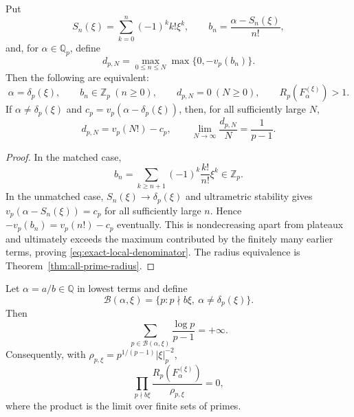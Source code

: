 \begin{proposition}
\label{prop:local-denominator-radius}
Put
\[
 S_n(\xi)=\sum_{k=0}^n(-1)^kk!\xi^k,
 \qquad b_n=\frac{\alpha-S_n(\xi)}{n!},
\]
and, for $\alpha\in\mathbb Q_p$, define
\[
 d_{p,N}=\max_{0\leq n\leq N}\max\{0,-v_p(b_n)\}.
\]
Then the following are equivalent:
\begin{equation}
 \alpha=\delta_p(\xi),\qquad
 b_n\in\mathbb Z_p\ (n\geq0),\qquad
 d_{p,N}=0\ (N\geq0),\qquad
 R_p(F_\alpha^{(\xi)})>1.
\label{eq:four-local-equivalences}
\end{equation}
If $\alpha\ne\delta_p(\xi)$ and
$c_p=v_p(\alpha-\delta_p(\xi))$, then, for all sufficiently large $N$,
\begin{equation}
 d_{p,N}=v_p(N!)-c_p,
 \qquad
 \lim_{N\to\infty}\frac{d_{p,N}}N=\frac1{p-1}.
\label{eq:exact-local-denominator}
\end{equation}
\end{proposition}

\begin{proof}
In the matched case,
\[
 b_n=\sum_{k\geq n+1}(-1)^k\frac{k!}{n!}\xi^k\in\mathbb Z_p.
\]
In the unmatched case, $S_n(\xi)\to\delta_p(\xi)$ and ultrametric
stability gives
$v_p(\alpha-S_n(\xi))=c_p$ for all sufficiently large $n$.  Hence
$-v_p(b_n)=v_p(n!)-c_p$ eventually.  This is nondecreasing apart from
plateaux and ultimately exceeds the maximum contributed by the finitely
many earlier terms, proving \eqref{eq:exact-local-denominator}.  The radius
equivalence is Theorem~\ref{thm:all-prime-radius}.
\end{proof}

\begin{corollary}
\label{cor:adelic-radius-defect}
Let $\alpha=a/b\in\mathbb Q$ in lowest terms and define
\[
 \mathcal B(\alpha,\xi)
 =\{p:p\nmid b\xi,\ \alpha\ne\delta_p(\xi)\}.
\]
Then
\begin{equation}
 \sum_{p\in\mathcal B(\alpha,\xi)}\frac{\log p}{p-1}=+\infty.
\label{eq:bad-prime-divergence}
\end{equation}
Consequently, with
$\rho_{p,\xi}=p^{1/(p-1)}|\xi|_p^{-2}$,
\begin{equation}
 \prod_{p\nmid b\xi}
 \frac{R_p(F_\alpha^{(\xi)})}{\rho_{p,\xi}}=0,
\label{eq:relative-adelic-product-zero}
\end{equation}
where the product is the limit over finite sets of primes.
\end{corollary}

